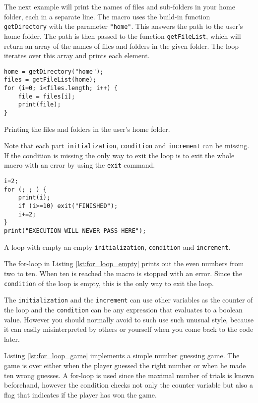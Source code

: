 The next example will print the names of files and sub-folders in your home folder, each in a separate line. The macro uses the build-in function {\tt getDirectory} with the parameter {\tt "home"}. This answers the path to the user's home folder. The path is then passed to the function {\tt getFileList}, which will return an array of the names of files and folders in the given folder. The loop iterates over this array and prints each element.

\begin{listing}[H]
\begin{verbatim}
home = getDirectory("home");
files = getFileList(home);
for (i=0; i<files.length; i++) {
	file = files[i];
	print(file);
}
\end{verbatim}
\caption{Printing the files and folders in the user's home folder.}
\label{lst:for_loop_home}
\end{listing}

Note that each part {\tt initialization}, {\tt condition} and {\tt increment} can be missing. If the condition is missing the only way to exit the loop is to exit the whole macro with an error by using the {\tt exit} command. 

\begin{listing}[H]
\begin{verbatim}
i=2;
for (; ; ) {
	print(i);
	if (i>=10) exit("FINISHED");
	i+=2;
}
print("EXECUTION WILL NEVER PASS HERE");
\end{verbatim}
\caption{A loop with empty an empty {\tt initialization}, {\tt condition} and {\tt increment}.}
\label{lst:for_loop_empty}
\end{listing}

The for-loop in Listing \ref{lst:for_loop_empty} prints out the even numbers from two to ten. When ten is reached the macro is stopped with an error. Since the {\tt condition} of the loop is empty, this is the only way to exit the loop. 

The {\tt initialization} and the {\tt increment} can use other variables as the counter of the loop and the {\tt condition} can be any expression that evaluates to a boolean value. However you should normally avoid to such use such unusual style, because it can easily misinterpreted by others or yourself when you come back to the code later.

Listing \ref{lst:for_loop_game} implements a simple number guessing game. The game is over either when the player guessed the right number or when he made ten wrong guesses. A for-loop is used since the maximal number of trials is known beforehand, however the condition checks not only the counter variable but also a flag that indicates if the player has won the game.

